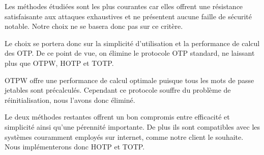 	Les méthodes étudiées sont les plus courantes car elles offrent une
	résistance satisfaisante aux attaques exhaustives et ne présentent aucune
	faille de sécurité notable. Notre choix ne se basera donc pas sur ce
	critère.

	Le choix se portera donc sur la simplicité d'utilisation et la performance
	de calcul des OTP. De ce point de vue, on élimine le protocole OTP
	standard, ne laissant plus que OTPW, HOTP et TOTP.

	OTPW offre une performance de calcul optimale puisque tous les mots de
	passe jetables sont précalculés. Cependant ce protocole souffre du
	problème de réinitialisation, nous l'avons donc éliminé.

	Le deux méthodes restantes offrent un bon compromis entre efficacité et
	simplicité ainsi qu'une pérennité importante. De plus ils sont compatibles avec les systèmes couramment employés sur internet, comme notre client le souhaite. Nous implémenterons donc HOTP
	et TOTP.

